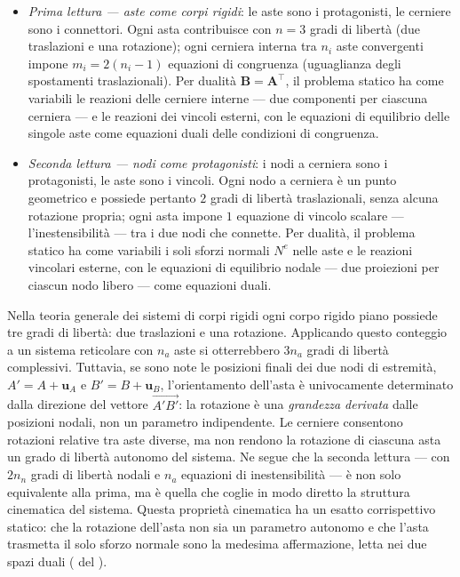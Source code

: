 \begin{itemize}[noitemsep]
	\item \emph{Prima lettura --- aste come corpi
		rigidi}: le aste sono i protagonisti, le cerniere
	sono i connettori. Ogni asta contribuisce con
	$n = 3$ gradi di libertà (due traslazioni e una
	rotazione); ogni cerniera interna tra $n_i$ aste
	convergenti impone $m_i = 2(n_i-1)$ equazioni
	di congruenza (uguaglianza degli spostamenti
	traslazionali). Per dualità $\bm{B}=\bm{A}^\top$,
	il problema statico ha come variabili le reazioni
	delle cerniere interne --- due componenti per
	ciascuna cerniera --- e le reazioni dei vincoli
	esterni, con le equazioni di equilibrio delle
	singole aste come equazioni duali delle condizioni
	di congruenza.
	
	\item \emph{Seconda lettura --- nodi come
		protagonisti}: i nodi a cerniera sono i
	protagonisti, le aste sono i vincoli. Ogni nodo
	a cerniera è un punto geometrico e possiede
	pertanto $2$ gradi di libertà traslazionali,
	senza alcuna rotazione propria; ogni asta impone
	$1$ equazione di vincolo scalare ---
	l'inestensibilità --- tra i due nodi che connette.
	Per dualità, il problema statico ha come variabili
	i soli sforzi normali $N^e$ nelle aste e le
	reazioni vincolari esterne, con le equazioni di
	equilibrio nodale --- due proiezioni per ciascun
	nodo libero --- come equazioni duali.
\end{itemize}


\begin{oss}\label{oss:rotazione_asta}
	Nella teoria generale dei sistemi di corpi rigidi
	ogni corpo rigido piano possiede tre gradi di
	libertà: due traslazioni e una rotazione.
	Applicando questo conteggio a un sistema
	reticolare con $n_a$ aste si otterrebbero
	$3n_a$ gradi di libertà complessivi.
	Tuttavia, se sono note le posizioni finali dei
	due nodi di estremità, $A' = A + \mathbf{u}_A$ e
	$B' = B + \mathbf{u}_B$, l'orientamento dell'asta
	è univocamente determinato dalla direzione del
	vettore $\overrightarrow{A'B'}$:
	la rotazione è una \emph{grandezza derivata}
	dalle posizioni nodali, non un parametro
	indipendente. Le cerniere consentono rotazioni
	relative tra aste diverse, ma non rendono la
	rotazione di ciascuna asta un grado di libertà
	autonomo del sistema. Ne segue che la seconda
	lettura --- con $2n_n$ gradi di libertà nodali
	e $n_a$ equazioni di inestensibilità --- è non
	solo equivalente alla prima, ma è quella che
	coglie in modo diretto la struttura cinematica
	del sistema. Questa proprietà cinematica ha un esatto corrispettivo
		statico: che la rotazione dell'asta non sia un parametro
		autonomo e che l'asta trasmetta il solo sforzo normale
		sono la medesima affermazione, letta nei due spazi duali
		( del ).
\end{oss}


